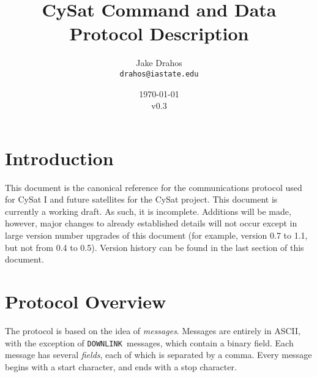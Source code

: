 \documentclass{article}
\begin{document}
\title{CySat Command and Data Protocol Description}
\author{Jake Drahos \\ \texttt{drahos@iastate.edu}}
\date{\today\\v0.3}


\newcommand{\mquery}{\texttt{QUERY }}
\newcommand{\mresult}{\texttt{RESULT }}
\newcommand{\mcommand}{\texttt{COMMAND }}
\newcommand{\mdownlink}{\texttt{DOWNLINK }}
\newcommand{\macommand}{\texttt{ACK\_COMMAND }}
\newcommand{\madownlink}{\texttt{ACK\_DOWNLINK }}
\newcommand{\merror}{\texttt{NACK\_ERROR }}

\newcommand{\example}[1] {
\smallskip
	\texttt{Example: !#1\$}
	
}

\newcommand{\fields}[1] {
\medskip
	\texttt{Fields: #1}
	 
}


\maketitle

\section{Introduction}
This document is the canonical reference for the communications protocol used for CySat I and
future satellites for the CySat project.
This document is currently a working draft. As such, it is incomplete. Additions will be made, however, major
changes to already established details will not occur except in large version number upgrades of this document (for example,
version 0.7 to 1.1, but not from 0.4 to 0.5).
Version history can be found in the last section of this document.

\section{Protocol Overview}
The protocol is based on the idea of \emph{messages}.
Messages are entirely in ASCII, with the exception of \mdownlink messages, which
contain a binary field.
Each message has several \emph{fields}, each of which is separated by a comma.
Every message begins with a start character, and ends with a stop character.
\end{document}
